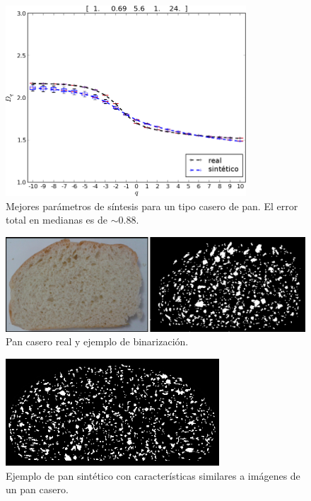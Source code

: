 \begin{figure}[!ht]
\centerline{\includegraphics[width=9cm]{figures/bestboxplot2}}
\caption[Mejores parámetros de síntesis para un tipo casero de pan]{Mejores parámetros de síntesis para un tipo casero de pan. El error total en medianas es de $\sim 0.88$.}
\label{bestboxplot2}
\end{figure}

\begin{figure}[!ht]
\begin{center}
\includegraphics[width=13cm]{figures/realbin2}
\caption{ Pan casero real y ejemplo de binarización.}
\label{realbin2}
\end{center}
\end{figure}

\begin{figure}[!ht]
\begin{center}
\includegraphics[width=8cm]{figures/best2}
\caption{Ejemplo de pan sintético con características similares a imágenes de un pan casero.}
\label{best2}
\end{center}
\end{figure}


